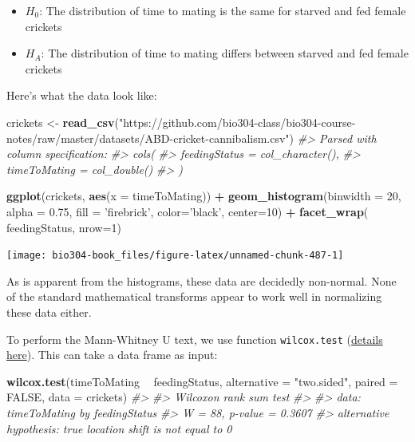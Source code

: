 \documentclass[]{book}
\newenvironment{Shaded}{\begin{snugshade}}{\end{snugshade}}
\newcommand{\CommentTok}[1]{\textcolor[rgb]{0.56,0.35,0.01}{\textit{#1}}}
\newcommand{\DataTypeTok}[1]{\textcolor[rgb]{0.13,0.29,0.53}{#1}}
\newcommand{\DecValTok}[1]{\textcolor[rgb]{0.00,0.00,0.81}{#1}}
\newcommand{\FloatTok}[1]{\textcolor[rgb]{0.00,0.00,0.81}{#1}}
\newcommand{\KeywordTok}[1]{\textcolor[rgb]{0.13,0.29,0.53}{\textbf{#1}}}
\newcommand{\NormalTok}[1]{#1}
\newcommand{\OperatorTok}[1]{\textcolor[rgb]{0.81,0.36,0.00}{\textbf{#1}}}
\newcommand{\OtherTok}[1]{\textcolor[rgb]{0.56,0.35,0.01}{#1}}
\newcommand{\StringTok}[1]{\textcolor[rgb]{0.31,0.60,0.02}{#1}}
\providecommand{\tightlist}{%
  \setlength{\itemsep}{0pt}\setlength{\parskip}{0pt}}
\theoremstyle{definition}
\theoremstyle{definition}
\theoremstyle{definition}
\theoremstyle{remark}
\begin{document}
\begin{itemize}
\tightlist
\item
  \(H_0\): The distribution of time to mating is the same for starved
  and fed female crickets
\item
  \(H_A\): The distribution of time to mating differs between starved
  and fed female crickets
\end{itemize}

Here's what the data look like:

\begin{Shaded}
\begin{Highlighting}[]
\NormalTok{crickets <-}\StringTok{ }\KeywordTok{read_csv}\NormalTok{(}\StringTok{"https://github.com/bio304-class/bio304-course-notes/raw/master/datasets/ABD-cricket-cannibalism.csv"}\NormalTok{)}
\CommentTok{#> Parsed with column specification:}
\CommentTok{#> cols(}
\CommentTok{#>   feedingStatus = col_character(),}
\CommentTok{#>   timeToMating = col_double()}
\CommentTok{#> )}

\KeywordTok{ggplot}\NormalTok{(crickets, }\KeywordTok{aes}\NormalTok{(}\DataTypeTok{x =}\NormalTok{ timeToMating)) }\OperatorTok{+}
\StringTok{  }\KeywordTok{geom_histogram}\NormalTok{(}\DataTypeTok{binwidth =} \DecValTok{20}\NormalTok{, }\DataTypeTok{alpha =} \FloatTok{0.75}\NormalTok{, }\DataTypeTok{fill =} \StringTok{'firebrick'}\NormalTok{, }\DataTypeTok{color=}\StringTok{'black'}\NormalTok{, }\DataTypeTok{center=}\DecValTok{10}\NormalTok{) }\OperatorTok{+}
\StringTok{  }\KeywordTok{facet_wrap}\NormalTok{(}\OperatorTok{~}\StringTok{ }\NormalTok{feedingStatus, }\DataTypeTok{nrow=}\DecValTok{1}\NormalTok{)}
\end{Highlighting}
\end{Shaded}

\begin{center}\texttt{[image: bio304-book\_files/figure-latex/unnamed-chunk-487-1]} \end{center}

As is apparent from the histograms, these data are decidedly non-normal.
None of the standard mathematical transforms appear to work well in
normalizing these data either.

To perform the Mann-Whitney U text, we use function \texttt{wilcox.test}
(\href{https://stat.ethz.ch/R-manual/R-devel/library/stats/html/wilcox.test.html}{details
here}). This can take a data frame as input:

\begin{Shaded}
\begin{Highlighting}[]
\KeywordTok{wilcox.test}\NormalTok{(timeToMating }\OperatorTok{~}\StringTok{ }\NormalTok{feedingStatus, }
            \DataTypeTok{alternative =} \StringTok{"two.sided"}\NormalTok{, }\DataTypeTok{paired =} \OtherTok{FALSE}\NormalTok{, }\DataTypeTok{data =}\NormalTok{ crickets)}
\CommentTok{#> }
\CommentTok{#>  Wilcoxon rank sum test}
\CommentTok{#> }
\CommentTok{#> data:  timeToMating by feedingStatus}
\CommentTok{#> W = 88, p-value = 0.3607}
\CommentTok{#> alternative hypothesis: true location shift is not equal to 0}
\end{Highlighting}
\end{Shaded}
\end{document}
